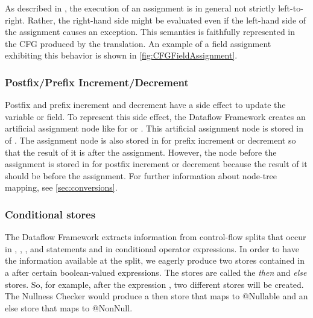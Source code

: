 As described in , the execution of an assignment is in
general not strictly left-to-right. Rather, the right-hand side might
be evaluated even if the left-hand side of the assignment causes an
exception. This semantics is faithfully represented in the CFG
produced by the translation.  An example of a field assignment
exhibiting this behavior is shown in \autoref{fig:CFGFieldAssignment}.


\subsubsection{Postfix/Prefix Increment/Decrement}
\label{sec:postpre-incdec}
Postfix and prefix increment and decrement have a side effect to
update the variable or field. To represent this side effect, the Dataflow
Framework creates an artificial assignment node like 
for  or . This artificial assignment node is stored
in  of . The assignment
node is also stored in  for prefix increment or decrement
so that the result of it is after the assignment. However, the node before
the assignment is stored in  for postfix increment or decrement
because the result of it should be before the assignment. For further information
about node-tree mapping, see \autoref{sec:conversions}.

\subsubsection{Conditional stores}
\label{sec:cond-stores}

The Dataflow Framework extracts information from control-flow splits
that occur in , , , and 
statements and in conditional operator expressions.  In order to have
the information available at the split, we eagerly produce two stores
contained in a  after certain
boolean-valued expressions.  The stores are called the \emph{then} and
\emph{else} stores.  So, for example, after the expression , two different stores will be created.  The Nullness Checker
would produce a then store that maps  to @Nullable and an else
store that maps  to @NonNull.

